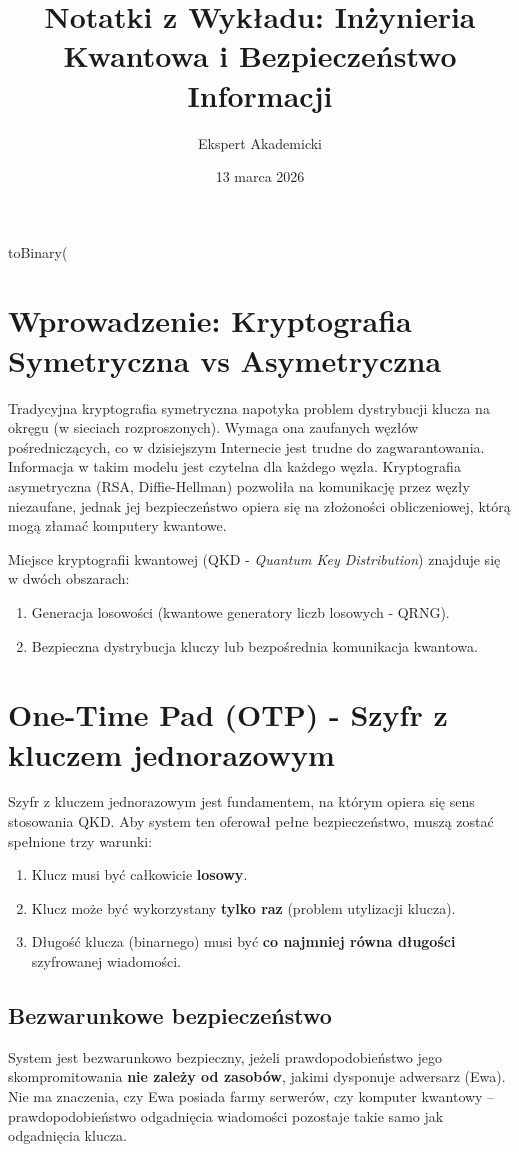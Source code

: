 toBinary(\documentclass{article}
\title{Notatki z Wykładu: Inżynieria Kwantowa i Bezpieczeństwo Informacji}
\author{Ekspert Akademicki}
\date{13 marca 2026}
\begin{document}
\maketitle

\section{Wprowadzenie: Kryptografia Symetryczna vs Asymetryczna}

Tradycyjna kryptografia symetryczna napotyka problem dystrybucji klucza na okręgu (w sieciach rozproszonych). Wymaga ona zaufanych węzłów pośredniczących, co w dzisiejszym Internecie jest trudne do zagwarantowania. Informacja w takim modelu jest czytelna dla każdego węzła.
Kryptografia asymetryczna (RSA, Diffie-Hellman) pozwoliła na komunikację przez węzły niezaufane, jednak jej bezpieczeństwo opiera się na złożoności obliczeniowej, którą mogą złamać komputery kwantowe.

Miejsce kryptografii kwantowej (QKD - \textit{Quantum Key Distribution}) znajduje się w dwóch obszarach:
\begin{enumerate}
    \item Generacja losowości (kwantowe generatory liczb losowych - QRNG).
    \item Bezpieczna dystrybucja kluczy lub bezpośrednia komunikacja kwantowa.
\end{enumerate}

\section{One-Time Pad (OTP) - Szyfr z kluczem jednorazowym}

Szyfr z kluczem jednorazowym jest fundamentem, na którym opiera się sens stosowania QKD. Aby system ten oferował pełne bezpieczeństwo, muszą zostać spełnione trzy warunki:
\begin{enumerate}
    \item Klucz musi być całkowicie \textbf{losowy}.
    \item Klucz może być wykorzystany \textbf{tylko raz} (problem utylizacji klucza).
    \item Długość klucza (binarnego) musi być \textbf{co najmniej równa długości} szyfrowanej wiadomości.
\end{enumerate}

\subsection{Bezwarunkowe bezpieczeństwo}
System jest bezwarunkowo bezpieczny, jeżeli prawdopodobieństwo jego skompromitowania \textbf{nie zależy od zasobów}, jakimi dysponuje adwersarz (Ewa). Nie ma znaczenia, czy Ewa posiada farmy serwerów, czy komputer kwantowy – prawdopodobieństwo odgadnięcia wiadomości pozostaje takie samo jak odgadnięcia klucza.
\end{document}
